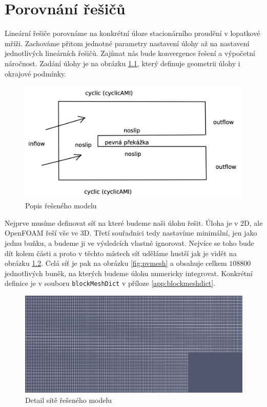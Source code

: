 \documentclass[a4paper,12pt]{report}
\theoremstyle{remark}
\begin{document}
	{\let\clearpage\relax \chapter{Porovnání řešičů}}
	
	Lineární řešiče porovnáme na konkrétní úloze stacionárního proudění v lopatkové mříži. Zachováme přitom jednotné parametry nastavení úlohy až na nastavení jednotlivých lineárních řešičů. Zajímat nás bude konvergence řešení a výpočetní náročnost. Zadání úlohy je na obrázku \ref{fig:zadani}, který definuje geometrii úlohy i okrajové podmínky. 
	
	\begin{figure}[H]
		\centering
		\includegraphics[width=1\linewidth]{zadani.png}
		\caption{Popis řešeného modelu}
		\label{fig:zadani}
	\end{figure}


Nejprve musíme definovat síť na které budeme naši úlohu řešit. Úloha je v 2D, ale OpenFOAM řeší vše ve 3D. Třetí souřadnici tedy nastavíme minimální, jen jako jednu buňku, a budeme ji ve výsledcích vlastně ignorovat.  Nejvíce se toho bude dít kolem  části a proto v těchto místech síť uděláme hustší jak je vidět na obrázku \ref{fig:pvmesh-detail}. Celá síť je pak na obrázku \ref{fig:pvmesh} a obsahuje celkem $108800$ jednotlivých buněk, na kterých budeme úlohu numericky integrovat. Konkrétní definice je v souboru \texttt{blockMeshDict} v příloze \ref{app:blockmeshdict}.

\begin{figure}[H]
	\centering
	\includegraphics[width=1\linewidth]{pv-mesh-detail.png}
	\caption{Detail sítě řešeného modelu}
	\label{fig:pvmesh-detail}
\end{figure}
\end{document}
